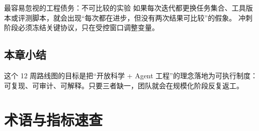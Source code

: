 \documentclass[a4paper]{article}
\begin{document}
\begin{warningbox}{最容易忽视的工程债务：不可比较的实验}
如果每次迭代都更换任务集合、工具版本或评测脚本，就会出现“每次都在进步，但没有两次结果可比较”的假象。  
冲刺阶段必须冻结关键协议，只在受控窗口调整变量。
\end{warningbox}

\subsection{本章小结}
这个 12 周路线图的目标是把“开放科学 + Agent 工程”的理念落地为可执行制度：可复现、可审计、可解释。只要三者缺一，团队就会在规模化阶段反复返工。


\section{术语与指标速查}
\end{document}
